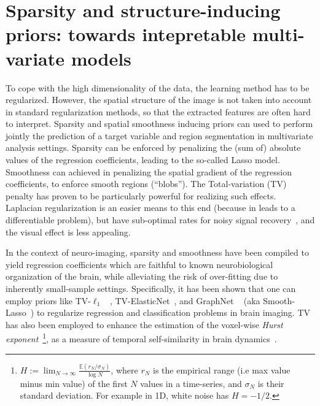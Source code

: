 \section{Sparsity and structure-inducing priors: towards intepretable multi-variate models}
To cope with the high dimensionality of the data, the learning method has to be
regularized. However, the spatial structure of the image is not
taken into account in standard regularization methods, so that the
extracted features are often hard to interpret.
Sparsity and spatial smoothness inducing priors can used to
perform jointly the prediction of a target variable and region
segmentation in multivariate analysis settings. Sparsity can be enforced by
penalizing the (sum of) absolute values of the regression coefficients, leading to the
so-called Lasso model. Smoothness can achieved in penalizing the spatial gradient of
the regression coefficients, to enforce smooth regions (``blobs'').
The Total-variation (TV)~\citep{rudin1992nonlinear} penalty has
proven to be particularly powerful for realizing such effects. Laplacian regularization
is an easier means to this end (because in leads to a differentiable problem),
but have sub-optimal rates for noisy signal recovery~\citep{minimaxtv}, and the visual effect is less appealing.

In the context of neuro-imaging, sparsity and smoothness have been compiled to yield
regression coefficients which are faithful to known neurobiological organization of the brain,
while alleviating the risk of over-fitting due to inherently small-sample settings.
Specifically, it has been shown that one can employ priors like TV-$\ell_1$
~\citep{baldassarre2012,gramfort2013}, TV-ElasticNet~\citep{dubois2014predictive},
and GraphNet ~\citep{grosenick2013}
(aka Smooth-Lasso~\citep{hebiri2011})
to regularize regression and classification
problems in brain imaging. TV has also been employed to enhance the estimation of the voxel-wise \textit{Hurst exponent}~\footnote{$H := \lim_{N \rightarrow \infty}\frac{\mathbb E(r_N/\sigma_N)}{\log N}$,
where $r_N$ is the empirical range (i.e max value minus min value) of the first $N$ values in a time-series, and $\sigma_N$ is their standard deviation. For example in 1D, white noise has $H = -1/2$.},
as a measure of temporal self-similarity in brain dynamics~\citep{pelle2016multivariate}.

